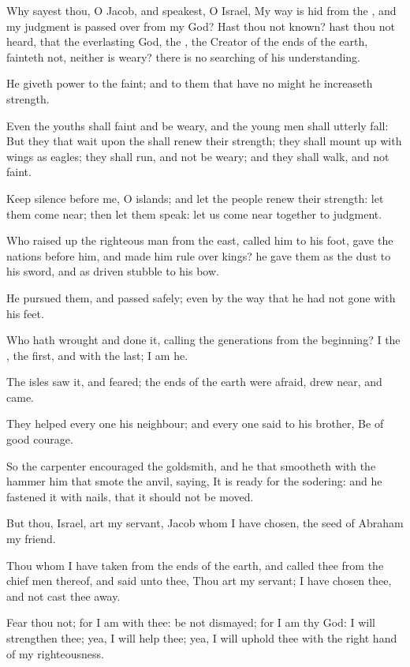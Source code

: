 \Verse Why sayest thou, O Jacob, and speakest, O Israel, My way is hid from the \LORD, and my judgment is passed over from my God?  \Verse Hast thou not known? hast thou not heard, that the everlasting God, the \LORD, the Creator of the ends of the earth, fainteth not, neither is weary? there is no searching of his understanding.

\Verse He giveth power to the faint; and to them that have no might he increaseth strength.

\Verse Even the youths shall faint and be weary, and the young men shall utterly fall: \Verse But they that wait upon the \LORD shall renew their strength; they shall mount up with wings as eagles; they shall run, and not be weary; and they shall walk, and not faint.


\Chapter
\Verse Keep silence before me, O islands; and let the people renew their strength: let them come near; then let them speak: let us come near together to judgment.

\Verse Who raised up the righteous man from the east, called him to his foot, gave the nations before him, and made him rule over kings? he gave them as the dust to his sword, and as driven stubble to his bow.

\Verse He pursued them, and passed safely; even by the way that he had not gone with his feet.

\Verse Who hath wrought and done it, calling the generations from the beginning? I the \LORD, the first, and with the last; I am he.

\Verse The isles saw it, and feared; the ends of the earth were afraid, drew near, and came.

\Verse They helped every one his neighbour; and every one said to his brother, Be of good courage.

\Verse So the carpenter encouraged the goldsmith, and he that smootheth with the hammer him that smote the anvil, saying, It is ready for the sodering: and he fastened it with nails, that it should not be moved.

\Verse But thou, Israel, art my servant, Jacob whom I have chosen, the seed of Abraham my friend.

\Verse Thou whom I have taken from the ends of the earth, and called thee from the chief men thereof, and said unto thee, Thou art my servant; I have chosen thee, and not cast thee away.

\Verse Fear thou not; for I am with thee: be not dismayed; for I am thy God: I will strengthen thee; yea, I will help thee; yea, I will uphold thee with the right hand of my righteousness.

